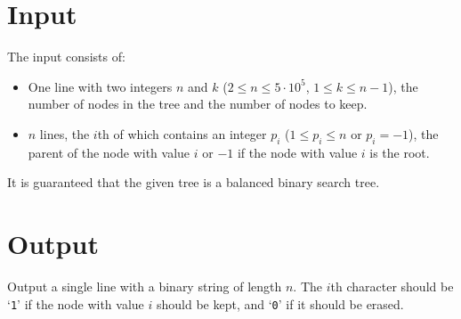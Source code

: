 \section*{Input}

The input consists of:
\begin{itemize}
  \item One line with two integers $n$ and $k$ ($2 \leq n \leq 5 \cdot 10^{5}$, $1 \leq k \leq n - 1$), the
    number of nodes in the tree and the number of nodes to keep.
\item $n$ lines, the $i$th of which contains an integer $p_i$ ($1\leq p_i \leq n$ or
	$p_i = -1$), the parent of the node with value $i$ or $-1$ if the node with value $i$ is the root.
\end{itemize}

It is guaranteed that the given tree is a balanced binary search tree.

\section*{Output}

Output a single line with a binary string of length $n$.
The $i$th character should be `\texttt{1}' if the node with value $i$ should be kept,
and `\texttt{0}' if it should be erased.

